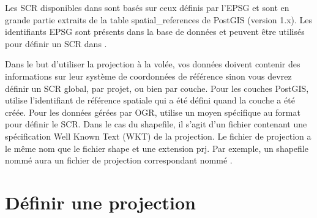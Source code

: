 Les SCR disponibles dans \qg sont basés sur ceux définis par
l'EPSG et sont en grande partie extraits de la table
spatial\_references de PostGIS (version 1.x). Les identifiants
EPSG sont présents dans la base de données et peuvent être utilisés pour définir
un SCR dans \qg. 

Dans le but d'utiliser la projection à la volée, vos données doivent contenir
des informations sur leur système de coordonnées de référence sinon vous devrez
définir un SCR global, par projet, ou bien par couche. Pour les couches
PostGIS, \qg utilise l'identifiant de référence spatiale qui a été défini
quand la couche a été créée. Pour les données gérées par OGR, \qg utilise un
moyen spécifique au format pour définir le SCR. Dans le cas du
shapefile, il s'agit d'un fichier contenant une spécification Well Known Text
(WKT) de la projection. Le fichier de projection a le même nom que
le fichier shape et une extension prj. Par exemple, un shapefile nommé
 aura un fichier de projection correspondant nommé
.

\section{Définir une projection}
\label{sec:projection-specifying}

